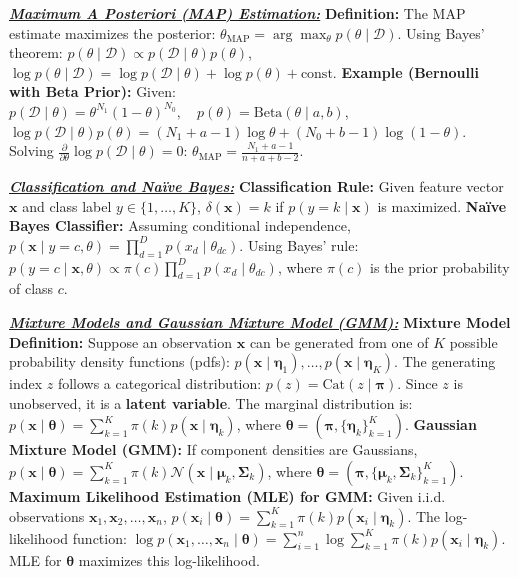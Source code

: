 \documentclass[10pt]{article}
\newcommand{\bulletPoint}[1]{\ul{\textit{\textbf{#1}}}}
\begin{document}
\begin{multicols*}{2}
\bulletPoint{Maximum A Posteriori (MAP) Estimation:}\quad
\textbf{Definition:} The MAP estimate maximizes the posterior:
$\theta_{\text{MAP}} = \arg\max_{\theta} p(\theta \mid \mathcal{D})$. Using Bayes' theorem: $p(\theta \mid \mathcal{D}) \propto p(\mathcal{D} \mid \theta) p(\theta)$,
$\log p(\theta \mid \mathcal{D}) = \log p(\mathcal{D} \mid \theta) + \log p(\theta) + \text{const}$. 
\textbf{Example (Bernoulli with Beta Prior):} Given:
$p(\mathcal{D} \mid \theta) = \theta^{N_1} (1 - \theta)^{N_0}, \quad p(\theta) = \text{Beta}(\theta \mid a, b)$,
$\log p(\mathcal{D} \mid \theta) p(\theta) = (N_1 + a - 1) \log \theta + (N_0 + b - 1) \log(1 - \theta)$.
Solving $\frac{\partial}{\partial \theta} \log p(\mathcal{D} \mid \theta) = 0$:
$\theta_{\text{MAP}} = \frac{N_1 + a - 1}{n + a + b - 2}$.

\bulletPoint{Classification and Naïve Bayes:}\quad
\textbf{Classification Rule:} Given feature vector $\mathbf{x}$ and class label $y \in \{1, \dots, K\}$,
$\delta(\mathbf{x}) = k$ if $p(y = k \mid \mathbf{x})$ is maximized. 
\textbf{Naïve Bayes Classifier:} Assuming conditional independence,
$p(\mathbf{x} \mid y = c, \theta) = \prod_{d=1}^{D} p(x_d \mid \theta_{dc})$. Using Bayes' rule: $p(y = c \mid \mathbf{x}, \theta) \propto \pi(c) \prod_{d=1}^{D} p(x_d \mid \theta_{dc})$, where $\pi(c)$ is the prior probability of class $c$.


\bulletPoint{Mixture Models and Gaussian Mixture Model (GMM):}\quad
\textbf{Mixture Model Definition:} Suppose an observation $\mathbf{x}$ can be generated from one of $K$ possible probability density functions (pdfs):
 $p(\mathbf{x} \mid \boldsymbol{\eta}_1), \dots, p(\mathbf{x} \mid \boldsymbol{\eta}_K)$.
The generating index $z$ follows a categorical distribution: $p(z) = \text{Cat}(z \mid \boldsymbol{\pi})$.
Since $z$ is unobserved, it is a \textbf{latent variable}. The marginal distribution is:
 $p(\mathbf{x} \mid \boldsymbol{\theta}) = \sum_{k=1}^{K} \pi(k) p(\mathbf{x} \mid \boldsymbol{\eta}_k)$,
 where $\boldsymbol{\theta} = (\boldsymbol{\pi}, \{ \boldsymbol{\eta}_k \}_{k=1}^{K})$. 
\textbf{Gaussian Mixture Model (GMM):} If component densities are Gaussians,
$p(\mathbf{x} \mid \boldsymbol{\theta}) = \sum_{k=1}^{K} \pi(k) \mathcal{N} (\mathbf{x} \mid \boldsymbol{\mu}_k, \boldsymbol{\Sigma}_k)$,
 where $\boldsymbol{\theta} = (\boldsymbol{\pi}, \{ \boldsymbol{\mu}_k, \boldsymbol{\Sigma}_k \}_{k=1}^{K})$. 
\textbf{Maximum Likelihood Estimation (MLE) for GMM:}
Given i.i.d. observations $\mathbf{x}_1, \mathbf{x}_2, \dots, \mathbf{x}_n$, $p(\mathbf{x}_i \mid \boldsymbol{\theta}) = \sum_{k=1}^{K} \pi(k) p(\mathbf{x}_i \mid \boldsymbol{\eta}_k)$.
The log-likelihood function: $\log p(\mathbf{x}_1, \dots, \mathbf{x}_n \mid \boldsymbol{\theta}) = \sum_{i=1}^{n} \log \sum_{k=1}^{K} \pi(k) p(\mathbf{x}_i \mid \boldsymbol{\eta}_k)$.
MLE for $\boldsymbol{\theta}$ maximizes this log-likelihood.



\end{multicols*}
\end{document}
